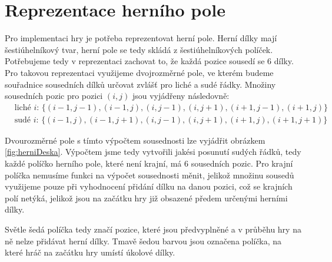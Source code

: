 \chapter{Reprezentace herního pole}

Pro implementaci hry je potřeba reprezentovat herní pole. Herní dílky mají šestiúhelníkový tvar, herní pole se tedy skládá z šestiúhelníkových políček. Potřebujeme tedy v reprezentaci zachovat to, že každá pozice sousedí se 6 dílky. Pro takovou reprezentaci využijeme dvojrozměrné pole, ve kterém budeme souřadnice sousedních dílků určovat zvlášť pro liché a sudé řádky. Množiny sousedních pozic pro pozici $(i,j)$ jsou vyjádřeny následovně:
\begin{align*}
    &\text{liché $i$: } \{(i-1,j-1),(i-1,j),(i,j-1),(i,j+1),(i+1,j-1),(i+1,j)\}\\
    &\text{sudé $i$: } \{(i-1,j),(i-1,j+1),(i,j-1),(i,j+1),(i+1,j),(i+1,j+1)\}
\end{align*}

Dvourozměrné pole s tímto výpočtem sousednosti lze vyjádřit obrázkem \ref{fig:herniDeska}. Výpočtem jsme tedy vytvořili jakési posunutí sudých řádků, tedy každé políčko herního pole, které není krajní, má 6 sousedních pozic. Pro krajní políčka nemusíme funkci na výpočet sousednosti měnit, jelikož množinu sousedů využijeme pouze při vyhodnocení přidání dílku na danou pozici, což se krajních polí netýká, jelikož jsou na začátku hry již obsazené předem určenými herními dílky.

\figureHerniDeska

Světle šedá políčka tedy značí pozice, které jsou předvyplněné a v průběhu hry na ně nelze přidávat herní dílky. Tmavě šedou barvou jsou označena políčka, na které hráč na začátku hry umístí úkolové dílky.



